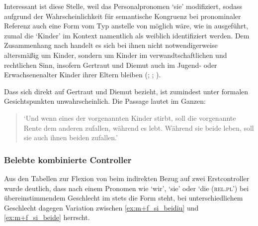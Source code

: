Interessant ist diese Stelle, weil  das Personalpronomen 
`sie' modifiziert, sodass aufgrund der Wahrscheinlichkeit für semantische
Kongruenz bei pronominaler Referenz auch eine Form vom Typ 
anstelle von  möglich wäre, wie in  ausgeführt,
zumal die  `Kinder' im Kontext namentlich als weiblich
identifiziert werden. Dem Zusammenhang nach handelt es sich bei ihnen nicht
notwendigerweise altersmäßig um Kinder, sondern um Kinder im
verwandt\-schaft\-lichen und rechtlichen Sinn, insofern Gertraut und Diemut
auch im Jugend- oder Erwachsenen\-alter Kinder ihrer Eltern bleiben
(\cites(Nr.~2960)[240,31+35]{cao4}; \cites(Nr.~2719, Nürnberg,
1297)[vgl.~auch][96,40--97,18]{cao4}; \cite[569, 619]{caor}).

Dass sich  direkt auf Gertraut und Diemut bezieht, ist
zumindest unter formalen Gesichtspunkten unwahrscheinlich. Die Passage lautet
im Ganzen:

\begin{quote}
	 \autocites(Nr.~2960)[240,37--39]{cao4}

`Und wenn eines der vorgenannten Kinder
stirbt, soll die vorgenannte Rente dem anderen zufallen, während es lebt.
Während sie beide leben, soll sie auch ihnen beiden zufallen.'
\end{quote}

\subsubsection{Belebte kombinierte Controller}

Aus den Tabellen  zur Flexion
von  beim indirekten Bezug auf zwei Erstcontroller wurde deutlich,
dass nach einem Pronomen wie  `wir',  `sie' oder 
`die (\textsc{rel.pl')} bei übereinstimmendem Geschlecht im \CAO{} stets die
Form  steht, bei unterschiedlichem Geschlecht dagegen Variation
zwischen  \cref{ex:m+f_si_beidiu} und 
\cref{ex:m+f_si_beide} herrscht.

